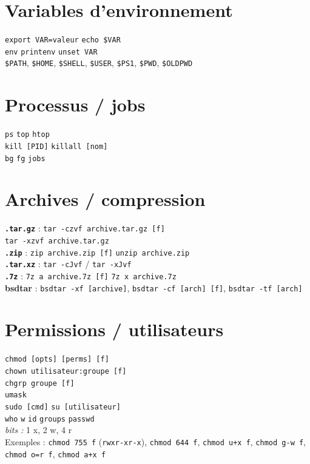 \documentclass[10pt]{article}
\begin{document}
\begin{multicols}{4}
\section*{Variables d'environnement}
\lstinline|export VAR=valeur| \quad \lstinline|echo $VAR| \\
\lstinline|env| \quad \lstinline|printenv| \quad \lstinline|unset VAR| \\
\lstinline|$PATH|, \lstinline|$HOME|, \lstinline|$SHELL|, \lstinline|$USER|, \lstinline|$PS1|, \lstinline|$PWD|, \lstinline|$OLDPWD| \\

\section*{Processus / jobs}
\lstinline|ps| \quad \lstinline|top| \quad \lstinline|htop| \\
\lstinline|kill [PID]| \quad \lstinline|killall [nom]| \\
\lstinline|bg| \quad \lstinline|fg| \quad \lstinline|jobs| \\

\section*{Archives / compression}
\textbf{\lstinline|.tar.gz|} : \lstinline|tar -czvf archive.tar.gz [f]| \\
\lstinline|tar -xzvf archive.tar.gz| \\
\textbf{\lstinline|.zip|} : \lstinline|zip archive.zip [f]| \quad \lstinline|unzip archive.zip| \\
\textbf{\lstinline|.tar.xz|} : \lstinline|tar -cJvf| / \lstinline|tar -xJvf| \\
\textbf{\lstinline|.7z|} : \lstinline|7z a archive.7z [f]| \quad \lstinline|7z x archive.7z| \\
\textbf{bsdtar} : \lstinline|bsdtar -xf [archive]|, \lstinline|bsdtar -cf [arch] [f]|, \lstinline|bsdtar -tf [arch]| \\

\section*{Permissions / utilisateurs}
\lstinline|chmod [opts] [perms] [f]| \\
\lstinline|chown utilisateur:groupe [f]| \\
\lstinline|chgrp groupe [f]| \\
\lstinline|umask| \\
\lstinline|sudo [cmd]| \quad \lstinline|su [utilisateur]| \\
\lstinline|who| \quad \lstinline|w| \quad \lstinline|id| \quad \lstinline|groups| \quad \lstinline|passwd| \\
\textit{bits :} 1 x, 2 w, 4 r \\
Exemples : \lstinline|chmod 755 f| (\lstinline|rwxr-xr-x|), \lstinline|chmod 644 f|, \lstinline|chmod u+x f|, \lstinline|chmod g-w f|, \lstinline|chmod o=r f|, \lstinline|chmod a+x f| \\


\end{multicols}
\end{document}
